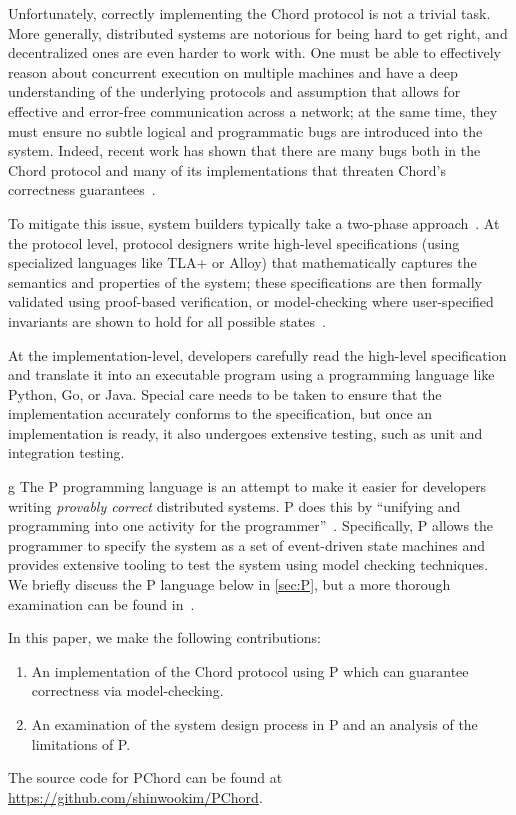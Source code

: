 \documentclass[conference]{IEEEtran}
\begin{document}
Unfortunately, correctly implementing the Chord protocol is not a trivial task. More generally, distributed systems are notorious for being hard to get right, and decentralized ones are even harder to work with. One must be able to effectively reason about concurrent execution on multiple machines and have a deep understanding of the underlying protocols and assumption that allows for effective and error-free communication across a network; at the same time, they must ensure no subtle logical and programmatic bugs are introduced into the system. Indeed, recent work has shown that there are many bugs both in the Chord protocol and many of its implementations that threaten Chord's correctness guarantees~\cite{zave_reasoning_2017}.

To mitigate this issue, system builders typically take a two-phase approach~\cite{newcombe_how_2015}. At the protocol level, protocol designers write high-level specifications (using specialized languages like TLA+ or Alloy) that mathematically captures the semantics and properties of the system; these specifications are then formally validated using proof-based verification, or model-checking where user-specified invariants are shown to hold for all possible states~\cite{jackson_alloy_2002,lamport_tla_1994}.

At the implementation-level, developers carefully read the high-level specification and translate it into an executable program using a programming language like Python, Go, or Java. Special care needs to be taken to ensure that the implementation accurately conforms to the specification, but once an implementation is ready, it also undergoes extensive testing, such as unit and integration testing. 

g
The P programming language is an attempt to make it easier for developers writing \textit{provably correct} distributed systems. P does this by ``unifying and programming into one activity for the programmer''~\cite{desai_p_2013}. Specifically, P allows the programmer to specify the system as a set of event-driven state machines and provides extensive tooling to test the system using model checking techniques. We briefly discuss the P language below in \autoref{sec:P}, but a more thorough examination can be found in~\cite{desai_p_2013}.

In this paper, we make the following contributions:
\begin{enumerate}
	\item An implementation of the Chord protocol using P which can guarantee correctness via model-checking.
	\item An examination of the system design process in P and an analysis of the limitations of P.
\end{enumerate}
The source code for PChord can be found at \url{https://github.com/shinwookim/PChord}.
\end{document}
